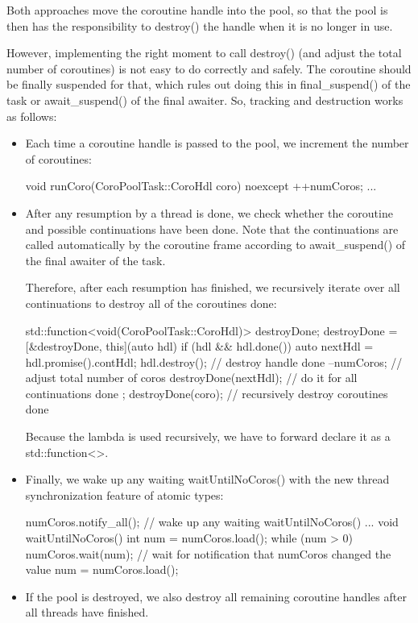 Both approaches move the coroutine handle into the pool, so that the pool is then has the responsibility to destroy() the handle when it is no longer in use.

However, implementing the right moment to call destroy() (and adjust the total number of coroutines) is not easy to do correctly and safely. The coroutine should be finally suspended for that, which rules out doing this in final\_suspend() of the task or await\_suspend() of the final awaiter. So, tracking and destruction works as follows:

\begin{itemize}
\item 
Each time a coroutine handle is passed to the pool, we increment the number of coroutines:

\begin{cpp}
void runCoro(CoroPoolTask::CoroHdl coro) noexcept {
	++numCoros;
	...
}
\end{cpp}

\item 
After any resumption by a thread is done, we check whether the coroutine and possible continuations have been done. Note that the continuations are called automatically by the coroutine frame according to await\_suspend() of the final awaiter of the task.

Therefore, after each resumption has finished, we recursively iterate over all continuations to destroy all of the coroutines done:

\begin{cpp}
std::function<void(CoroPoolTask::CoroHdl)> destroyDone;
destroyDone = [&destroyDone, this](auto hdl) {
					if (hdl && hdl.done()) {
						auto nextHdl = hdl.promise().contHdl;
						hdl.destroy(); // destroy handle done
						--numCoros; // adjust total number of coros
						destroyDone(nextHdl); // do it for all continuations done
					}
				};
destroyDone(coro); // recursively destroy coroutines done
\end{cpp}

Because the lambda is used recursively, we have to forward declare it as a std::function<>.

\item 
Finally, we wake up any waiting waitUntilNoCoros() with the new thread synchronization feature of atomic types:

\begin{cpp}
numCoros.notify_all(); // wake up any waiting waitUntilNoCoros()
...
void waitUntilNoCoros() {
	int num = numCoros.load();
	while (num > 0) {
		numCoros.wait(num); // wait for notification that numCoros changed the value
		num = numCoros.load();
	}
}
\end{cpp}

\item 
If the pool is destroyed, we also destroy all remaining coroutine handles after all threads have finished.
\end{itemize}


